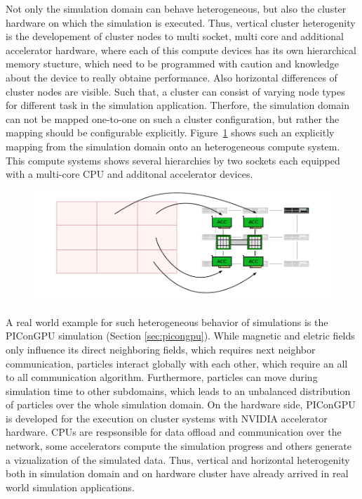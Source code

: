   Not only the simulation domain can behave heterogeneous, but also
  the cluster hardware on which the simulation is executed. Thus,
  vertical cluster heterogenity is the developement of cluster nodes
  to multi socket, multi core and additional accelerator hardware,
  where each of this compute devices has its own hierarchical memory
  stucture, which need to be programmed with caution and knowledge
  about the device to really obtaine performance.  Also horizontal
  differences of cluster nodes are visible. Such that, a cluster can
  consist of varying node types for different task in the simulation
  application. Therfore, the simulation domain can not be mapped
  one-to-one on such a cluster configuration, but rather the mapping
  should be configurable explicitly. Figure~\ref{fig:heterogeneous_cluster_node}
  shows such an explicitly mapping from the simulation domain onto
  an heterogeneous compute system. This compute systems shows several
  hierarchies by two sockets each equipped with a multi-core CPU
  and additonal accelerator devices.

  \begin{figure}[H]
    \centering \includegraphics[width=\textwidth]{graphics/30_heterogeneous_cluster_node}
    \caption{}
    \label{fig:heterogeneous_cluster_node}
  \end{figure}

  A real world example for such heterogeneous behavior of simulations
  is the PIConGPU simulation (Section \ref{sec:picongpu}). While
  magnetic and eletric fields only influence its direct neighboring
  fields, which requires next neighbor communication, particles
  interact globally with each other, which require an all to all
  communication algorithm. Furthermore, particles can move during
  simulation time to other subdomains, which leads to an unbalanced
  distribution of particles over the whole simulation domain. On the
  hardware side, PIConGPU is developed for the execution on cluster
  systems with NVIDIA accelerator hardware.  CPUs are respsonsible for
  data offload and communication over the network, some accelerators
  compute the simulation progress and others generate a vizualization
  of the simulated data. Thus, vertical and horizontal heterogenity
  both in simulation domain and on hardware cluster have already
  arrived in real world simulation applications.

